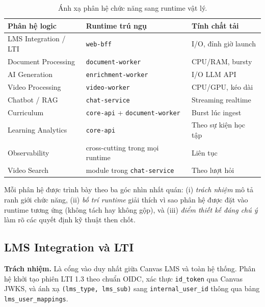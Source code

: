 \begin{table}[H]
    \centering
    \caption{Ánh xạ phân hệ chức năng sang runtime vật lý.}
    \label{tab:service-to-runtime}
    \begin{tabular}{|p{4.5cm}|p{5cm}|p{4cm}|}
        \hline
        \textbf{Phân hệ logic} & \textbf{Runtime trú ngụ} & \textbf{Tính chất tải} \\
        \hline
        LMS Integration / LTI & \texttt{web-bff} & I/O, đỉnh giờ launch \\
        \hline
        Document Processing & \texttt{document-worker} & CPU/RAM, bursty \\
        \hline
        AI Generation & \texttt{enrichment-worker} & I/O LLM API \\
        \hline
        Video Processing & \texttt{video-worker} & CPU/GPU, kéo dài \\
        \hline
        Chatbot / RAG & \texttt{chat-service} & Streaming realtime \\
        \hline
        Curriculum & \texttt{core-api} + \texttt{document-worker} & Burst lúc ingest \\
        \hline
        Learning Analytics & \texttt{core-api} & Theo sự kiện học tập \\
        \hline
        Observability & cross-cutting trong mọi runtime & Liên tục \\
        \hline
        Video Search & module trong \texttt{chat-service} & Theo lượt hỏi \\
        \hline
    \end{tabular}
\end{table}

Mỗi phân hệ được trình bày theo ba góc nhìn nhất quán: (i) \textit{trách
nhiệm} mô tả ranh giới chức năng, (ii) \textit{bố trí runtime} giải thích vì
sao phân hệ được đặt vào runtime tương ứng (không tách hay không gộp), và
(iii) \textit{điểm thiết kế đáng chú ý} làm rõ các quyết định kỹ thuật then
chốt.

\subsection{LMS Integration và LTI}

\textbf{Trách nhiệm.} Là cổng vào duy nhất giữa Canvas LMS và toàn hệ thống.
Phân hệ khởi tạo phiên LTI 1.3 theo chuẩn OIDC, xác thực \texttt{id\_token}
qua Canvas JWKS, và ánh xạ \texttt{(lms\_type, lms\_sub)} sang
\texttt{internal\_user\_id} thông qua bảng \texttt{lms\_user\_mappings}.

